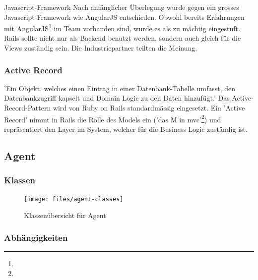 \begin{decision}{Javascript-Framework}
Nach anfänglicher Überlegung wurde gegen ein grosses Javascript-Framework wie AngularJS entschieden. Obwohl bereits Erfahrungen mit AngularJS\footnote{} im Team vorhanden sind, wurde es als zu mächtig eingestuft. Rails sollte nicht nur als Backend benutzt werden, sondern auch gleich für die Views zuständig sein. Die Industriepartner teilten die Meinung. 
\end{decision}

\subsubsection*{Active Record}

'Ein Objekt, welches einen Eintrag in einer Datenbank-Tabelle umfasst, den Datenbankzugriff kapselt und Domain Logic zu den Daten hinzufügt.'
Das Active-Record-Pattern wird von Ruby on Rails standardmässig eingesetzt. Ein 'Active Record' nimmt in Rails die Rolle des Models ein ('das M in \gls{mvc}'\footnote{}) und repräsentiert den Layer im System, welcher für die Business Logic zuständig ist.


\cite{agilemanifesto}

\subsection*{Agent} \label{sec:architecture:agent}


\subsubsection*{Klassen}
\begin{figure}[H]
	\centering
	\texttt{[image: files/agent-classes]}
	\caption{Klassenübersicht für Agent}
	\label{fig:tec:agentclasses}
\end{figure}

\subsubsection*{Abhängigkeiten}

